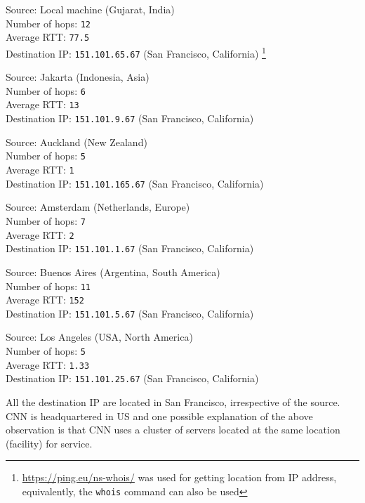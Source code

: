 \documentclass[11pt, fleqn]{article}
\begin{document}
Source: Local machine (Gujarat, India)\\
Number of hops: \texttt{12}\\
Average RTT: \texttt{77.5}\\
Destination IP: \texttt{151.101.65.67} (San Francisco, California) \footnote{\url{https://ping.eu/ns-whois/} was used for getting location from IP address, equivalently, the \texttt{whois} command can also be used}

\hrulefill
\smallskip

Source: Jakarta (Indonesia, Asia)\\
Number of hops: \texttt{6}\\
Average RTT: \texttt{13}\\
Destination IP: \texttt{151.101.9.67} (San Francisco, California)

\hrulefill
\smallskip

Source: Auckland (New Zealand)\\
Number of hops: \texttt{5}\\
Average RTT: \texttt{1}\\
Destination IP: \texttt{151.101.165.67} (San Francisco, California)

\hrulefill
\smallskip

Source: Amsterdam (Netherlands, Europe)\\
Number of hops: \texttt{7}\\
Average RTT: \texttt{2}\\
Destination IP: \texttt{151.101.1.67} (San Francisco, California)

\hrulefill
\smallskip

Source: Buenos Aires (Argentina, South America)\\
Number of hops: \texttt{11}\\
Average RTT: \texttt{152}\\
Destination IP: \texttt{151.101.5.67} (San Francisco, California)

\hrulefill
\smallskip

Source: Los Angeles (USA, North America)\\
Number of hops: \texttt{5}\\
Average RTT: \texttt{1.33}\\
Destination IP: \texttt{151.101.25.67} (San Francisco, California)

\hrulefill

All the destination IP are located in San Francisco, irrespective of the source. \\
CNN is headquartered in US and one possible explanation of the above observation is that CNN uses a cluster of servers located at the same location (facility) for service.
\end{document}
